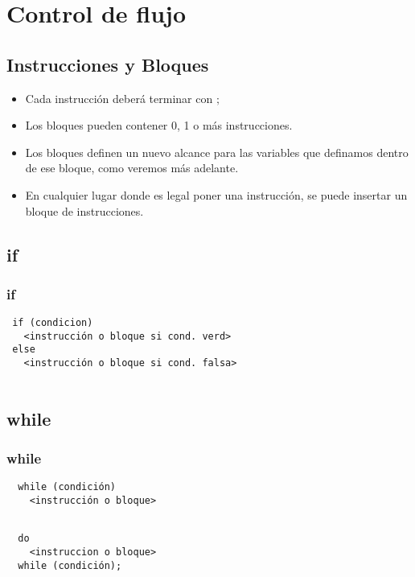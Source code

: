 \documentclass{beamer}
\begin{document}
% 
% 

\section{Control de flujo}

\subsection{Instrucciones y Bloques}
\begin{frame}
\begin{itemize}
 \item Cada instrucción deberá terminar con $;$
 \item Los bloques pueden contener 0, 1 o más instrucciones. 
 \item Los bloques definen un nuevo alcance para las variables que definamos dentro de ese bloque, como veremos más adelante.
 \item En cualquier lugar donde es legal poner una instrucción, se puede insertar un bloque de instrucciones.
\end{itemize}
\end{frame}

\subsection{if}
\begin{frame}[fragile]
\frametitle{if}

\begin{verbatim}
 if (condicion) 
   <instrucción o bloque si cond. verd>
 else 
   <instrucción o bloque si cond. falsa>
 
\end{verbatim}

\end{frame}

\subsection{while}
\begin{frame}[fragile]
\frametitle{while}

\begin{verbatim}
  while (condición) 
    <instrucción o bloque>
  
\end{verbatim}

\begin{verbatim}
  do 
    <instruccion o bloque>
  while (condición); 
\end{verbatim}

\end{frame}
\end{document}
